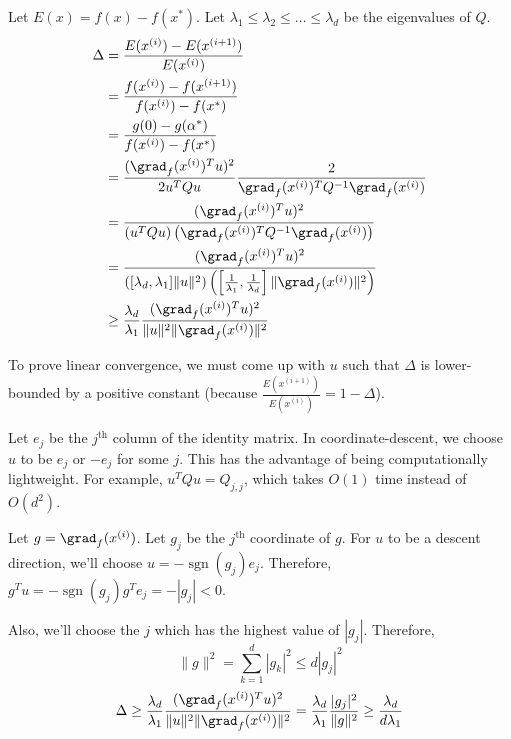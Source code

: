 Let $E(x) = f(x) - f(x^*)$.
Let $\lambda_1 \le \lambda_2 \le \ldots \le \lambda_d$ be the eigenvalues of $Q$.
\begin{align*}
\Delta &= \frac{E(x^{(i)}) - E(x^{(i+1)})}{E(x^{(i)})}
\\ &= \frac{f(x^{(i)}) - f(x^{(i+1)})}{f(x^{(i)}) - f(x^*)}
\\ &= \frac{g(0) - g(\alpha^*)}{f(x^{(i)}) - f(x^*)}
\\ &= \frac{(\grad_f(x^{(i)})^Tu)^2}{2u^TQu} \frac{2}{\grad_f(x^{(i)})^T Q^{-1} \grad_f(x^{(i)})}
\\ &= \frac{(\grad_f(x^{(i)})^Tu)^2}{(u^TQu)\left(\grad_f(x^{(i)})^T Q^{-1} \grad_f(x^{(i)})\right)}
\\ &= \frac{(\grad_f(x^{(i)})^Tu)^2}{\left( [\lambda_d, \lambda_1]\|u\|^2 \right)
    \left( \left[\frac{1}{\lambda_1}, \frac{1}{\lambda_d}\right]\|\grad_f(x^{(i)})\|^2 \right)}
\\ &\ge \frac{\lambda_d}{\lambda_1} \frac{(\grad_f(x^{(i)})^Tu)^2}{\|u\|^2 \|\grad_f(x^{(i)})\|^2}
\end{align*}

To prove linear convergence, we must come up with $u$
such that $\Delta$ is lower-bounded by a positive constant
(because $\frac{E(x^{(i+1)})}{E(x^{(i)})} = 1 - \Delta$).

Let $e_j$ be the $j^{\textrm{th}}$ column of the identity matrix.
In coordinate-descent, we choose $u$ to be $e_j$ or $-e_j$ for some $j$.
This has the advantage of being computationally lightweight.
For example, $u^TQu = Q_{j,j}$, which takes $O(1)$ time instead of $O(d^2)$.

Let $g = \grad_f(x^{(i)})$. Let $g_j$ be the $j^{\textrm{th}}$ coordinate of $g$.
For $u$ to be a descent direction, we'll choose $u = -\operatorname{sgn}(g_j)e_j$.
Therefore, $g^Tu = -\operatorname{sgn}(g_j) g^Te_j = -|g_j| < 0$.

Also, we'll choose the $j$ which has the highest value of $|g_j|$.
Therefore,
\[ \|g\|^2 = \sum_{k=1}^d |g_k|^2 \le d |g_j|^2 \]
\[ \Delta \ge \frac{\lambda_d}{\lambda_1} \frac{(\grad_f(x^{(i)})^Tu)^2}{\|u\|^2 \|\grad_f(x^{(i)})\|^2}
= \frac{\lambda_d}{\lambda_1} \frac{|g_j|^2}{\|g\|^2} \ge \frac{\lambda_d}{d\lambda_1} \]


